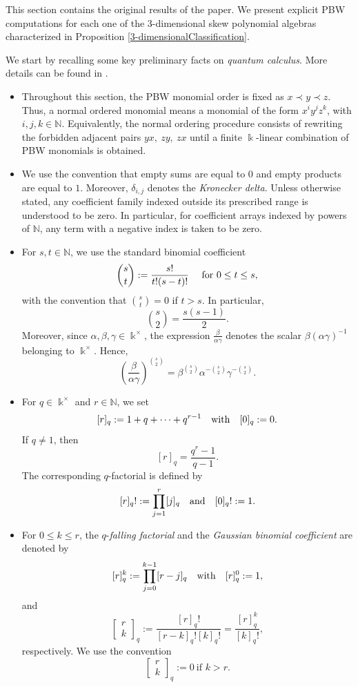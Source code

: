 \documentclass{amsart}
\theoremstyle{definition}
\theoremstyle{remark}
\numberwithin{equation}{section}
\begin{document}
This section contains the original results of the paper. We present explicit PBW computations for each one of the $3$-dimensional skew polynomial algebras characterized in Proposition \ref{3-dimensionalClassification}.

We start by recalling some key preliminary facts on {\em quantum calculus}. More details can be found in \cite{Andrewsetal1999, KacCheung2002, MansourSchork2015Book}.
\begin{itemize}
    \item Throughout this section, the PBW monomial order is fixed as $x \prec y \prec z$. Thus, a normal ordered monomial means a monomial of the form $x^i y^j z^k$, with $i,j,k\in\mathbb{N}$. Equivalently, the normal ordering procedure consists of rewriting the forbidden adjacent pairs $yx,\ zy,\ zx$ until a finite $\Bbbk$-linear combination of PBW monomials is obtained.

    \item We use the convention that empty sums are equal to $0$ and empty products are equal to $1$. Moreover, $\delta_{i,j}$ denotes the {\em Kronecker delta}. Unless otherwise stated, any coefficient family indexed outside its prescribed range is understood to be zero. In particular, for coefficient arrays indexed by powers of $\mathbb{N}$, any term with a negative index is taken to be zero.

    \item For $s,t\in\mathbb{N}$, we use the standard binomial coefficient
    \[
    \dbinom{s}{t} := \frac{s!}{t!(s-t)!} \quad \text{ for } 0\leq t\leq s,
    \]
    with the convention that $\binom{s}{t}=0$ if $t > s$. In particular,
    \[
    \binom{s}{2}=\frac{s(s-1)}{2}.
    \]
    Moreover, since $\alpha,\beta,\gamma\in\Bbbk^\times$, the expression $\frac{\beta}{\alpha\gamma}$ denotes the scalar $\beta(\alpha\gamma)^{-1}$ belonging to $\Bbbk^\times$. Hence,
    \[
    \left(\frac{\beta}{\alpha\gamma}\right)^{\binom{s}{2}} = \beta^{\binom{s}{2}}\alpha^{-\binom{s}{2}}\gamma^{-\binom{s}{2}}.
    \]

    \item For $q\in\Bbbk^\times$ and $r\in\mathbb{N}$, we set
    \[
    [r]_q:=1+q+\cdots+q^{r-1} \quad {\rm with} \quad [0]_q:=0.
    \]
    If $q\neq 1$, then
    \[
    [r]_q=\frac{q^r-1}{q-1}.
    \]
    The corresponding $q$-factorial is defined by
    \[
    [r]_q! := \prod_{j=1}^{r}[j]_q \quad {\rm and} \quad [0]_q! := 1.
    \]

    \item For $0\leq k\leq r$, the $q$-{\em falling factorial} and the {\em Gaussian binomial coefficient} are denoted by
    \[
        [r]^k_q:=\prod_{j=0}^{k-1}[r-j]_q \quad {\rm with} \quad [r]^0_q:=1,
    \]
    and
    \[
        \begin{bmatrix}
            r\\ k
        \end{bmatrix}_q := \frac{[r]_q!}{[r-k]_q![k]_q!} = \frac{[r]^k_q}{[k]_q!}, 
    \]
    respectively. We use the convention
    \[
        \begin{bmatrix}
            r\\ k
        \end{bmatrix}_q := 0 \ \text{if } k>r.
    \]


\end{itemize}
\end{document}
